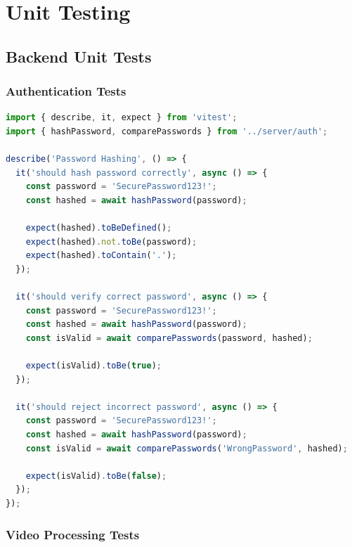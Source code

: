 \section{Unit Testing}

\subsection{Backend Unit Tests}

\subsubsection{Authentication Tests}

\begin{lstlisting}[language=JavaScript, caption=Password Hashing Tests]
import { describe, it, expect } from 'vitest';
import { hashPassword, comparePasswords } from '../server/auth';

describe('Password Hashing', () => {
  it('should hash password correctly', async () => {
    const password = 'SecurePassword123!';
    const hashed = await hashPassword(password);
    
    expect(hashed).toBeDefined();
    expect(hashed).not.toBe(password);
    expect(hashed).toContain('.');
  });
  
  it('should verify correct password', async () => {
    const password = 'SecurePassword123!';
    const hashed = await hashPassword(password);
    const isValid = await comparePasswords(password, hashed);
    
    expect(isValid).toBe(true);
  });
  
  it('should reject incorrect password', async () => {
    const password = 'SecurePassword123!';
    const hashed = await hashPassword(password);
    const isValid = await comparePasswords('WrongPassword', hashed);
    
    expect(isValid).toBe(false);
  });
});
\end{lstlisting}

\subsubsection{Video Processing Tests}

